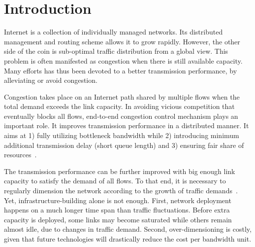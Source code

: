 \chapter{Introduction}
\label{sec:intro}


Internet is a collection of individually managed networks.
Its distributed management and routing scheme allows it to grow rapidly.
However, the other side of the coin is sub-optimal traffic distribution from a global view.
This problem is often manifested as congestion when there is still available capacity.
Many efforts has thus been devoted to a better transmission performance, by alleviating or avoid congestion.

Congestion takes place on an Internet path shared by multiple flows when the total demand exceeds the link capacity.
In avoiding vicious competition that eventually blocks all flows, end-to-end congestion control mechanism plays an important role. It improves transmission performance in a distributed manner.
It aims at 1) fully utilizing bottleneck bandwidth while 2) introducing minimum additional transmission delay (short queue length) and 3) ensuring fair share of resources~\cite{Jacobson1988, mathis1997macroscopic, Cardwell2016}.

The transmission performance can be further improved with big enough link capacity to satisfy the demand of all flows. To that end, it is necessary to regularly dimension the network according to the growth of traffic demands~\cite{pioro2004routing}. 
Yet, infrastructure-building alone is not enough. First, network deployment happens on a much longer time span than traffic fluctuations. Before extra capacity is deployed, some links may become saturated while others remain almost idle, due to changes in traffic demand. Second, over-dimensioning is costly, given that future technologies will drastically reduce the cost per bandwidth unit.

